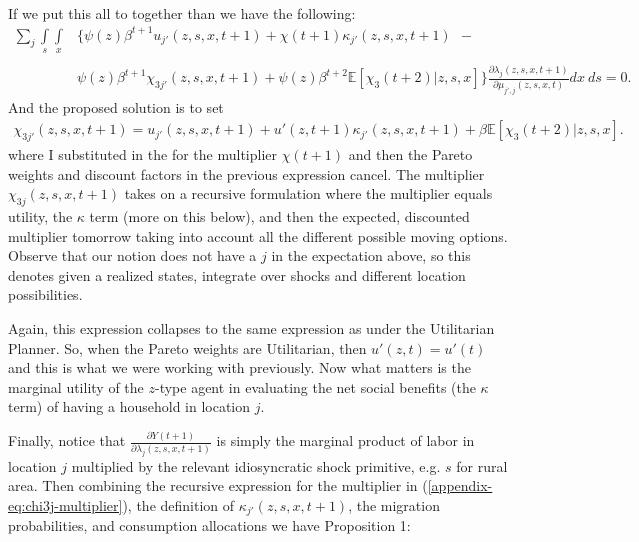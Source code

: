 \documentclass[12pt,pdftex]{article}
\begin{document}
\begin{onehalfspacing}
{\begin{align}
\end{align}}
If we put this all to together than we have the following:
{\small
\begin{align}
\sum_{j}  \int\limits_{s} \int\limits_{x} &\bigg \{ \psi(z) \beta^{t+1} u_{j'}(z,s,x,t+1) + \chi(t+1) \kappa_{j'}(z,s,x,t+1) \ \ - \ \ \\
\nonumber \\
&\psi(z)\beta^{t+1}\chi_{3j'}(z,s,x, t+1) + \psi(z)\beta^{t+2}\mathbb{E}\left[\chi_{3}(t+2) | z,s,x \right] \bigg \} \frac{\partial \lambda_{j}(z,s,x,t+1)}{\partial \mu_{j',j}(z,s,x,t)} dx \ ds = 0.
\end{align}}
And the proposed solution is to set
\begin{align}
\chi_{3j'}(z, s, x, t+1) =  u_{j'}(z,s,x,t+1) +   u'(z,t+1) \kappa_{j'}(z,s,x,t+1) +  \beta \mathbb{E}\left[\chi_{3}(t+2) |z, s, x \right].
\label{appendix-eq:chi3j-multiplier}
\end{align}
where I substituted in the for the multiplier $\chi(t+1)$ and then the Pareto weights and discount factors in the previous expression cancel. The multiplier $\chi_{3j}(z, s, x, t+1)$ takes on a recursive formulation where the multiplier equals utility, the $\kappa$ term (more on this below), and then the expected, discounted multiplier tomorrow taking into account all the different possible moving options. Observe that our notion does not have a $j$ in the expectation above, so this denotes given a realized states, integrate over shocks and different location possibilities.

Again, this expression collapses to the same expression as under the Utilitarian Planner. So, when the Pareto weights are Utilitarian, then $u'(z, t) = u'(t)$ and this is what we were working with previously. Now what matters is the marginal utility of the $z$-type agent in evaluating the net social benefits (the $\kappa$ term) of having a household in location $j$.


Finally, notice that $\frac{\partial Y(t+1)}{\partial \lambda_{j}(z, s, x, t+1)} $ is simply the marginal product of labor in location $j$ multiplied by the relevant idiosyncratic shock primitive, e.g. $s$ for rural area. Then combining the recursive expression for the multiplier in (\ref{appendix-eq:chi3j-multiplier}), the definition of $\kappa_{j'}(z, s,x,t+1)$,  the migration probabilities, and consumption allocations we have Proposition 1:


\end{onehalfspacing}
\end{document}
